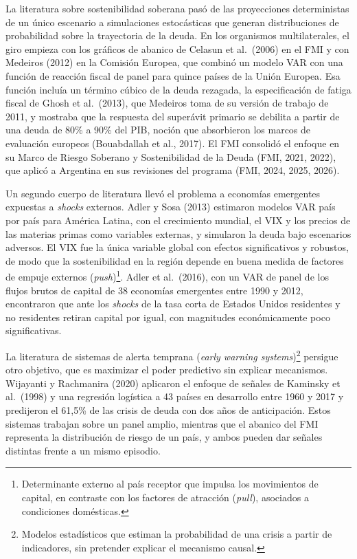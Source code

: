 La literatura sobre sostenibilidad soberana pasó de las proyecciones
deterministas de un único escenario a simulaciones estocásticas que
generan distribuciones de probabilidad sobre la trayectoria de la deuda.
En los organismos multilaterales, el giro empieza con los gráficos de
abanico de Celasun et al.~(2006) en el FMI y con Medeiros (2012) en la
Comisión Europea, que combinó un modelo VAR con una función de reacción
fiscal de panel para quince países de la Unión Europea. Esa función
incluía un término cúbico de la deuda rezagada, la especificación de
fatiga fiscal de Ghosh et al.~(2013), que Medeiros toma de su versión de
trabajo de 2011, y mostraba que la respuesta del superávit primario se
debilita a partir de una deuda de 80\% a 90\% del PIB, noción que
absorbieron los marcos de evaluación europeos (Bouabdallah et al.,
2017). El FMI consolidó el enfoque en su Marco de Riesgo Soberano y
Sostenibilidad de la Deuda (FMI, 2021, 2022), que aplicó a Argentina en
sus revisiones del programa (FMI, 2024, 2025, 2026).

Un segundo cuerpo de literatura llevó el problema a economías emergentes
expuestas a \emph{shocks} externos. Adler y Sosa (2013) estimaron
modelos VAR país por país para América Latina, con el crecimiento
mundial, el VIX y los precios de las materias primas como variables
externas, y simularon la deuda bajo escenarios adversos. El VIX fue la
única variable global con efectos significativos y robustos, de modo que
la sostenibilidad en la región depende en buena medida de factores de
empuje externos (\emph{push})\footnote{Determinante externo al país
  receptor que impulsa los movimientos de capital, en contraste con los
  factores de atracción (\emph{pull}), asociados a condiciones
  domésticas.}. Adler et al.~(2016), con un VAR de panel de los flujos
brutos de capital de 38 economías emergentes entre 1990 y 2012,
encontraron que ante los \emph{shocks} de la tasa corta de Estados
Unidos residentes y no residentes retiran capital por igual, con
magnitudes económicamente poco significativas.

La literatura de sistemas de alerta temprana (\emph{early warning
systems})\footnote{Modelos estadísticos que estiman la probabilidad de
  una crisis a partir de indicadores, sin pretender explicar el
  mecanismo causal.} persigue otro objetivo, que es maximizar el poder
predictivo sin explicar mecanismos. Wijayanti y Rachmanira (2020)
aplicaron el enfoque de señales de Kaminsky et al.~(1998) y una
regresión logística a 43 países en desarrollo entre 1960 y 2017 y
predijeron el 61,5\% de las crisis de deuda con dos años de
anticipación. Estos sistemas trabajan sobre un panel amplio, mientras
que el abanico del FMI representa la distribución de riesgo de un país,
y ambos pueden dar señales distintas frente a un mismo episodio.

